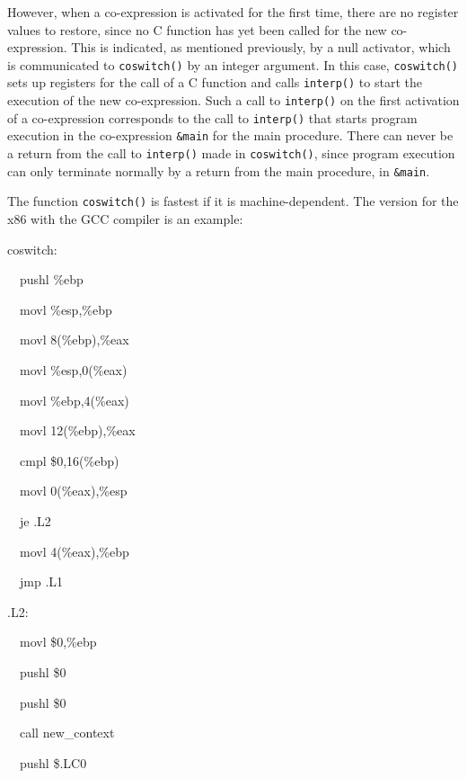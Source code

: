 However, when a co-expression is activated for the first time, there
are no register values to restore, since no C function has yet been
called for the new co-expression. This is indicated, as mentioned
previously, by a null activator, which is communicated to
\texttt{coswitch()} by an integer argument. In this case,
\texttt{coswitch()} sets up registers for the call of a C function and
calls \texttt{interp()} to start the execution of the new
co-expression.  Such a call to \texttt{interp()} on the first
activation of a co-expression corresponds to the call to
\texttt{interp()} that starts program execution in the co-expression
\texttt{\&main} for the main procedure. There can never be a return
from the call to \texttt{interp()} made in \texttt{coswitch()}, since
program execution can only terminate normally by a return from the
main procedure, in \texttt{\&main}.


The function \texttt{coswitch()} is fastest if it is
machine-dependent. The version for the x86 with the GCC compiler is an
example:

{\ttfamily\mdseries
coswitch:}

{\ttfamily\mdseries
\ \ pushl \%ebp}

{\ttfamily\mdseries
\ \ movl \%esp,\%ebp}

{\ttfamily\mdseries
\ \ movl 8(\%ebp),\%eax}

{\ttfamily\mdseries
\ \ movl \%esp,0(\%eax)}

{\ttfamily\mdseries
\ \ movl \%ebp,4(\%eax)}

{\ttfamily\mdseries
\ \ movl 12(\%ebp),\%eax}

{\ttfamily\mdseries
\ \ cmpl \$0,16(\%ebp)}

{\ttfamily\mdseries
\ \ movl 0(\%eax),\%esp}

{\ttfamily\mdseries
\ \ je .L2}


\bigskip

{\ttfamily\mdseries
\ \ movl 4(\%eax),\%ebp}

{\ttfamily\mdseries
\ \ jmp .L1}


\bigskip

{\ttfamily\mdseries
.L2:}

{\ttfamily\mdseries
\ \ movl \$0,\%ebp}

{\ttfamily\mdseries
\ \ pushl \$0}

{\ttfamily\mdseries
\ \ pushl \$0}

{\ttfamily\mdseries
\ \ call new\_context}

{\ttfamily\mdseries
\ \ pushl \$.LC0}

